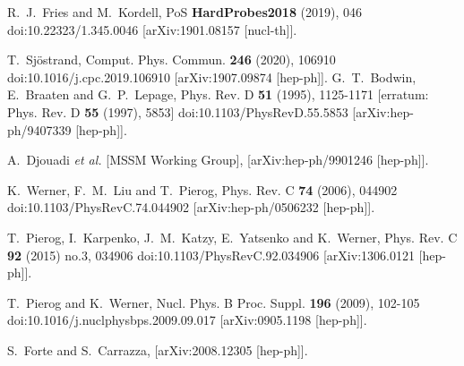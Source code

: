 \begin{thebibliography}{99}
R.~J.~Fries and M.~Kordell,
PoS \textbf{HardProbes2018} (2019), 046
doi:10.22323/1.345.0046
[arXiv:1901.08157 [nucl-th]].

T.~Sj\"ostrand,
Comput. Phys. Commun. \textbf{246} (2020), 106910
doi:10.1016/j.cpc.2019.106910
[arXiv:1907.09874 [hep-ph]].
G.~T.~Bodwin, E.~Braaten and G.~P.~Lepage,
Phys. Rev. D \textbf{51} (1995), 1125-1171
[erratum: Phys. Rev. D \textbf{55} (1997), 5853]
doi:10.1103/PhysRevD.55.5853
[arXiv:hep-ph/9407339 [hep-ph]].

A.~Djouadi \textit{et al.} [MSSM Working Group],
[arXiv:hep-ph/9901246 [hep-ph]].

K.~Werner, F.~M.~Liu and T.~Pierog,
Phys. Rev. C \textbf{74} (2006), 044902
doi:10.1103/PhysRevC.74.044902
[arXiv:hep-ph/0506232 [hep-ph]].

T.~Pierog, I.~Karpenko, J.~M.~Katzy, E.~Yatsenko and K.~Werner,
Phys. Rev. C \textbf{92} (2015) no.3, 034906
doi:10.1103/PhysRevC.92.034906
[arXiv:1306.0121 [hep-ph]].

T.~Pierog and K.~Werner,
Nucl. Phys. B Proc. Suppl. \textbf{196} (2009), 102-105
doi:10.1016/j.nuclphysbps.2009.09.017
[arXiv:0905.1198 [hep-ph]].

S.~Forte and S.~Carrazza,
[arXiv:2008.12305 [hep-ph]].



\end{thebibliography}
